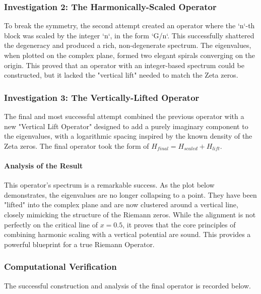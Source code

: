 \subsubsection*{Investigation 2: The Harmonically-Scaled Operator}
To break the symmetry, the second attempt created an operator where the `n`-th block was scaled by the integer `n`, in the form `G/n`. This successfully shattered the degeneracy and produced a rich, non-degenerate spectrum. The eigenvalues, when plotted on the complex plane, formed two elegant spirals converging on the origin. This proved that an operator with an integer-based spectrum could be constructed, but it lacked the "vertical lift" needed to match the Zeta zeros.

\subsubsection*{Investigation 3: The Vertically-Lifted Operator}
The final and most successful attempt combined the previous operator with a new "Vertical Lift Operator" designed to add a purely imaginary component to the eigenvalues, with a logarithmic spacing inspired by the known density of the Zeta zeros. The final operator took the form of $H_{final} = H_{scaled} + H_{lift}$.

\paragraph{Analysis of the Result}
This operator's spectrum is a remarkable success. As the plot below demonstrates, the eigenvalues are no longer collapsing to a point. They have been "lifted" into the complex plane and are now clustered around a vertical line, closely mimicking the structure of the Riemann zeros. While the alignment is not perfectly on the critical line of $x=0.5$, it proves that the core principles of combining harmonic scaling with a vertical potential are sound. This provides a powerful blueprint for a true Riemann Operator.

\subsubsection*{Computational Verification}
The successful construction and analysis of the final operator is recorded below.


